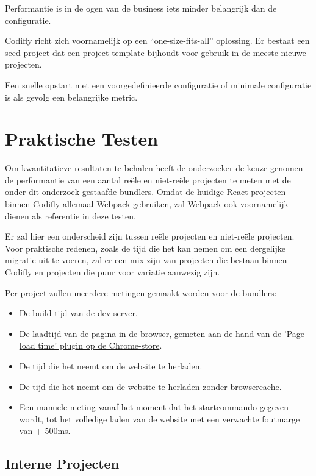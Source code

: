 Performantie is in de ogen van de business iets minder belangrijk dan de configuratie.

Codifly richt zich voornamelijk op een ``one-size-fits-all'' oplossing. Er bestaat een seed-project dat een project-template bijhoudt voor gebruik in de meeste nieuwe projecten.

Een snelle opstart met een voorgedefinieerde configuratie of minimale configuratie is als gevolg een belangrijke metric.

\section{Praktische Testen}

Om kwantitatieve resultaten te behalen heeft de onderzoeker de keuze genomen de performantie van een aantal reële en niet-reële projecten te meten met de onder dit onderzoek gestaafde bundlers. Omdat de huidige React-projecten binnen Codifly allemaal Webpack gebruiken, zal Webpack ook voornamelijk dienen als referentie in deze testen.

Er zal hier een onderscheid zijn tussen reële projecten en niet-reële projecten. Voor praktische redenen, zoals de tijd die het kan nemen om een dergelijke migratie uit te voeren, zal er een mix zijn van projecten die bestaan binnen Codifly en projecten die puur voor variatie aanwezig zijn.

Per project zullen meerdere metingen gemaakt worden voor de bundlers:

\begin{itemize}
    \item De build-tijd van de dev-server.
    \item De laadtijd van de pagina in de browser, gemeten aan de hand van de \href{https://chrome.google.com/webstore/detail/page-load-time/fploionmjgeclbkemipmkogoaohcdbig?hl=en}{'Page load time' plugin op de Chrome-store}.
    \item De tijd die het neemt om de website te herladen.
    \item De tijd die het neemt om de website te herladen zonder browsercache.
    \item Een manuele meting vanaf het moment dat het startcommando gegeven wordt, tot het volledige laden van de website met een verwachte foutmarge van +-500ms.
\end{itemize}

\subsection{Interne Projecten}

